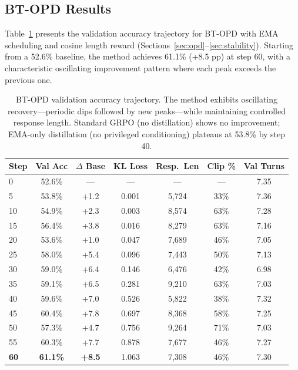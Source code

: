 \documentclass{article}
\begin{document}
\subsection{BT-OPD Results}
\label{sec:opd_results}

Table~\ref{tab:opd_trajectory} presents the validation accuracy trajectory for BT-OPD with EMA scheduling and cosine length reward (Sections~\ref{sec:opd}--\ref{sec:stability}). Starting from a 52.6\% baseline, the method achieves 61.1\% (+8.5 pp) at step 60, with a characteristic oscillating improvement pattern where each peak exceeds the previous one.

\begin{table}[t]
\centering
\caption{BT-OPD validation accuracy trajectory. The method exhibits oscillating recovery---periodic dips followed by new peaks---while maintaining controlled response length. Standard GRPO (no distillation) shows no improvement; EMA-only distillation (no privileged conditioning) plateaus at 53.8\% by step 40.}
\label{tab:opd_trajectory}
\begin{tabular}{lcccccc}
\toprule
\textbf{Step} & \textbf{Val Acc} & \textbf{$\Delta$ Base} & \textbf{KL Loss} & \textbf{Resp.\ Len} & \textbf{Clip \%} & \textbf{Val Turns} \\
\midrule
0 & 52.6\% & --- & --- & --- & --- & 7.35 \\
5 & 53.8\% & +1.2 & 0.001 & 5,724 & 33\% & 7.36 \\
10 & 54.9\% & +2.3 & 0.003 & 8,574 & 63\% & 7.28 \\
15 & 56.4\% & +3.8 & 0.016 & 8,279 & 63\% & 7.16 \\
20 & 53.6\% & +1.0 & 0.047 & 7,689 & 46\% & 7.05 \\
25 & 58.0\% & +5.4 & 0.096 & 7,443 & 50\% & 7.13 \\
30 & 59.0\% & +6.4 & 0.146 & 6,476 & 42\% & 6.98 \\
35 & 59.1\% & +6.5 & 0.281 & 9,210 & 63\% & 7.03 \\
40 & 59.6\% & +7.0 & 0.526 & 5,822 & 38\% & 7.32 \\
45 & 60.4\% & +7.8 & 0.697 & 8,368 & 58\% & 7.25 \\
50 & 57.3\% & +4.7 & 0.756 & 9,264 & 71\% & 7.03 \\
55 & 60.3\% & +7.7 & 0.878 & 7,677 & 46\% & 7.27 \\
\textbf{60} & \textbf{61.1\%} & \textbf{+8.5} & 1.063 & 7,308 & 46\% & 7.30 \\
\bottomrule
\end{tabular}
\end{table}
\end{document}
